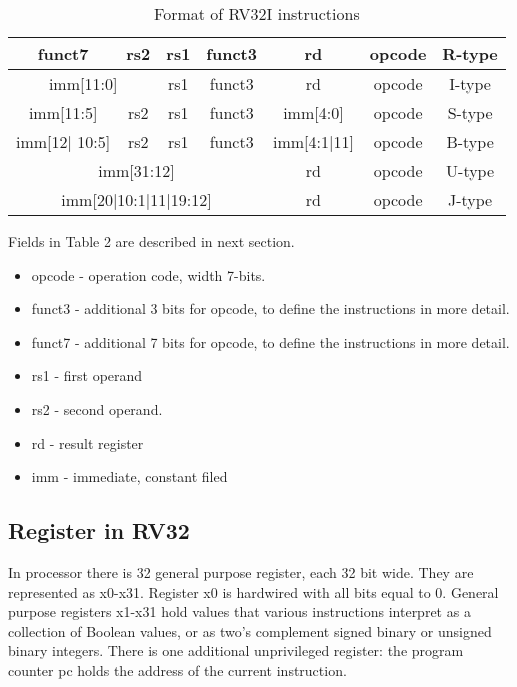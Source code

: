 \documentclass{scrreprt}
\begin{document}
      \begin{table}[ht]
          \centering
          \begin{tabular}{|c|c|c|c|c|c|c|} \hline  
               funct7 & rs2 & rs1 & funct3 & rd & opcode & R-type\\ \hline  
               \multicolumn{2}{|c|}{imm[11:0]} & rs1 & funct3 & rd & opcode & I-type \\ \hline  
               imm[11:5] & rs2 & rs1 & funct3 & imm[4:0] & opcode &  S-type\\ \hline  
               imm[12| 10:5]& rs2 & rs1 & funct3 & imm[4:1|11] & opcode &  B-type\\ \hline  
               \multicolumn{4}{|c|}{imm[31:12]}  & rd & opcode &  U-type\\ \hline  
               \multicolumn{4}{|c|}{imm[20|10:1|11|19:12]} & rd & opcode &  J-type\\ \hline 
          \end{tabular}
          \caption{Format of RV32I instructions}
          \label{tab:table2}
      \end{table}  

    Fields in Table 2 are described in next section.
     \begin{itemize}
        \item  opcode - operation code, width 7-bits.
        \item  funct3 - additional 3 bits for opcode, to define the instructions in more detail.
        \item  funct7 - additional 7 bits for opcode, to define the instructions in more detail.
        \item  rs1 - first operand
        \item  rs2 - second operand.
        \item  rd - result register
        \item  imm - immediate, constant filed
    \end{itemize}

    \subsection*{Register in RV32}
    In processor there is 32 general purpose register, each 32 bit wide. They are represented as x0-x31. Register x0 is hardwired with all bits equal to 0. General purpose registers x1-x31 hold values that various instructions interpret as a collection of Boolean values, or as two's complement signed binary or unsigned binary integers. 
    There is one additional unprivileged register: the program counter pc holds the address of the
current instruction.
    
\end{document}
